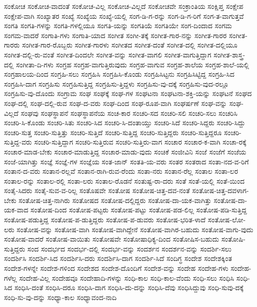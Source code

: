 {ಸಂಕೋಚ
ಸಂಕೋಚ-ವಾದಂತೆ
ಸಂಕೋಚ-ವಿಲ್ಲ
ಸಂಕೋಚ-ವಿಲ್ಲದೆ
ಸಂಕೋಚವೇ
ಸಂಕ್ರಾಂತಿಯ
ಸಂಕ್ಷಿಪ್ತ
ಸಂಕ್ಷೇಪ
ಸಂಕ್ಷೇಪ-ವಾಗಿ
ಸಂಖ್ಯಾತರ
ಸಂಖ್ಯೆ
ಸಂಖ್ಯೆಯ
ಸಂಖ್ಯೆ-ಯಲ್ಲಿ
ಸಂಗ-ಡಿ-ಗ-ರನ್ನು
ಸಂಗ-ಡಿ-ಗ-ರಿಗೆ
ಸಂಗ-ತ-ವಾಗುತ್ತವೆ
ಸಂಗತಿ
ಸಂಗತಿ-ಗಳನ್ನು
ಸಂಗತಿ-ಗಳಲ್ಲಿಯೂ
ಸಂಗತಿ-ಯನ್ನು
ಸಂಗತಿಯೆ
ಸಂಗತಿಯೇ
ಸಂಗ-ದಿಂದಾದ
ಸಂಗಮ
ಸಂಗಮ-ವಾದರೆ
ಸಂಗಾತಿ-ಗಳು
ಸಂಗಾತಿ-ಯಾದ
ಸಂಗೀತ
ಸಂಗೀ-ತಕ್ಕೆ
ಸಂಗೀತ-ಗಾರ-ನನ್ನು
ಸಂಗೀತ-ಗಾರರ
ಸಂಗೀತ-ಗಾರರು
ಸಂಗೀತ-ಗಾರ-ರೊಬ್ಬರು
ಸಂಗೀತ-ಗಾರಳು
ಸಂಗೀತದ
ಸಂಗೀತ-ದಂತೆ
ಸಂಗೀತ-ದಲ್ಲಿ
ಸಂಗೀತ-ದಲ್ಲಿಯೂ
ಸಂಗೀತ-ದಲ್ಲಿ-ರು-ವಂತೆ
ಸಂಗೀತ-ದಿಂದಲೇ
ಸಂಗೀತ-ವನ್ನು
ಸಂಗೀತ-ವಾಗಲಿ
ಸಂಗೀತ-ವಾಗುತ್ತಿದ್ದಾಗ
ಸಂಗೀತ-ಶಾಸ್ತ್ರ-ದಲ್ಲಿ
ಸಂಗೀತಾ-ದಿ-ಗಳು
ಸಂಗ್ರಹ
ಸಂಗ್ರಹ-ವಾಗುತ್ತಿರುವುದು
ಸಂಗ್ರಹ-ವಾಗುವ
ಸಂಗ್ರಹ-ಶಾಲೆಯ
ಸಂಗ್ರಹ-ಶಾಲೆ-ಯಲ್ಲಿ
ಸಂಗ್ರಹಾಲಯ-ದಿಂದ
ಸಂಗ್ರಹಿ-ಸಲು
ಸಂಗ್ರಹಿಸಿ
ಸಂಗ್ರಹಿಸಿ-ಕೊಂಡು
ಸಂಗ್ರಹಿಸಿಟ್ಟನು
ಸಂಗ್ರಹಿಸಿಟ್ಟಿದ್ದ
ಸಂಗ್ರಹಿ-ಸಿದ
ಸಂಗ್ರಹಿಸಿ-ದಾಗ
ಸಂಗ್ರಹಿಸು
ಸಂಗ್ರಹಿಸುತ್ತಿದ್ದ
ಸಂಗ್ರಹಿಸು-ತ್ತಿದ್ದಳು
ಸಂಗ್ರಹಿಸು-ವು-ದಕ್ಕೆ
ಸಂಗ್ರಹಿಸು-ವುದ-ರಲ್ಲೂ
ಸಂಗ್ರಹಿಸು-ವು-ದೊಂದು
ಸಂಗ್ರಾಮ
ಸಂಘ
ಸಂಘಕ್ಕೆ
ಸಂಘ-ಗಳ
ಸಂಘಟನಾ
ಸಂಘಟನಾ-ಶಕ್ತಿ-ಯನ್ನು
ಸಂಘಟನೆ
ಸಂಘದ
ಸಂಘ-ದಲ್ಲಿ
ಸಂಘ-ದಲ್ಲಿ-ರುವ
ಸಂಘ-ದ-ವರು
ಸಂಘ-ದಿಂದ
ಸಂಘ-ರೂಪ-ವಾಗಿ
ಸಂಘರ್ಷಣೆ
ಸಂಘ-ವನ್ನು
ಸಂಘ-ವಿಲ್ಲದೆ
ಸಂಘವು
ಸಂಘಸ್ಥಾಪನೆ
ಸಂಘಸ್ಥಾಪನೆಯ
ಸಂಚ-ಕಾರ
ಸಂಚರಿ-ಸದ
ಸಂಚರಿ-ಸಲಿ
ಸಂಚರಿ-ಸಲು
ಸಂಚರಿಸಿ
ಸಂಚರಿ-ಸಿ-ಕೊಂಡು
ಸಂಚರಿ-ಸಿತು
ಸಂಚರಿ-ಸಿದ
ಸಂಚರಿ-ಸಿ-ದಂತಾಯ್ತು
ಸಂಚರಿ-ಸಿದೆ
ಸಂಚರಿ-ಸಿದ್ದರು
ಸಂಚರಿ-ಸಿದ್ದು
ಸಂಚರಿ-ಸುತ್ತ
ಸಂಚರಿ-ಸುತ್ತಿತ್ತು
ಸಂಚರಿ-ಸುತ್ತಿದೆ
ಸಂಚರಿ-ಸುತ್ತಿದ್ದ
ಸಂಚರಿ-ಸುತ್ತಿದ್ದರು
ಸಂಚರಿ-ಸುತ್ತಿದ್ದರೂ
ಸಂಚರಿ-ಸುತ್ತಿದ್ದ-ವರು
ಸಂಚರಿ-ಸುತ್ತಿದ್ದಾಗ
ಸಂಚರಿ-ಸುತ್ತಿರುವ
ಸಂಚರಿ-ಸುತ್ತಿರು-ವಾಗ
ಸಂಚಾರ
ಸಂಚಾರ-ಕ-ವಾಗಿ
ಸಂಚಾ-ರಕ್ಕೆ
ಸಂಚಾರ-ಮಾಡ-ಬೇಕು
ಸಂಚಾರ-ಮಾಡುತ್ತಿದ್ದ
ಸಂಚಾರ-ಮಾಡು-ವುದು
ಸಂಚಿಕೆ
ಸಂಜೀವಿನಿ
ಸಂಜೆ
ಸಂಜೆಗೆ
ಸಂಜೆಯ
ಸಂಜೆ-ಯಾಗಿತ್ತು
ಸಂಜ್ಞೆ
ಸಂಜ್ಞೆ-ಗಳ
ಸಂಜ್ಞೆಯ
ಸಂತ-ಜಾನ್
ಸಂತತಿ-ಯ-ವರು
ಸಂತರ
ಸಂತರಾದ
ಸಂತಾ-ನದ-ವ-ರಿಗೆ
ಸಂತಾನ-ದ-ವರು
ಸಂತಾನ-ರಲ್ಲವೆ
ಸಂತಾನ-ರಾಗಿ-ರುವ-ರೆಂದು
ಸಂತಾ-ನರು
ಸಂತಾನ-ರೆಲ್ಲ
ಸಂತಾಲ
ಸಂತಾ-ಲರ
ಸಂತಾಲ-ರನ್ನು
ಸಂತಾಲ-ರಲ್ಲಿ
ಸಂತಾ-ಲರು
ಸಂತಾಲ-ರೊಡನೆ
ಸಂತುಷ್ಟ-ರಾ-ದರು
ಸಂತೆ
ಸಂತೆ-ಯಲ್ಲಿ
ಸಂತೆ-ಯಿಂದ
ಸಂತೈ-ಸಿದರು
ಸಂತೈ-ಸುವ-ವ-ರಿಲ್ಲ
ಸಂತೊಷವೇ
ಸಂತೋಷ
ಸಂತೋಷ-ಚಿತ್ತ-ದವ-ನಂತೆ
ಸಂತೋಷ-ಚಿತ್ತ-ದವಳಾಗ-ಬೇಕು
ಸಂತೋಷ-ಚಿತ್ತ-ನಾಗಿರು
ಸಂತೋಷದ
ಸಂತೋಷ-ದಲ್ಲಿದ್ದರು
ಸಂತೋಷ-ದಾ-ಯಕ-ವಾಗಿತ್ತು
ಸಂತೋಷ-ದಾ-ಯಕ-ವಾದ
ಸಂತೋಷ-ದಿಂದ
ಸಂತೋಷ-ಪಟ್ಟರು
ಸಂತೋಷ-ಪಟ್ಟು
ಸಂತೋಷ-ಪಡ-ಲಿಲ್ಲ
ಸಂತೋಷ-ಪಡಿ-ಸುತ್ತಿದ್ದ
ಸಂತೋಷ-ಪಡುತ್ತಿದ್ದ
ಸಂತೋಷ-ಪ-ಡುತ್ತಿದ್ದರು
ಸಂತೋಷ-ಪ-ಡುವರು
ಸಂತೋಷ-ಭರಿತ-ಳಾದೆ
ಸಂತೋಷ-ಲೋ-ಲರು
ಸಂತೋಷ-ವನ್ನು
ಸಂತೋಷ-ವಾಗಿ
ಸಂತೋಷ-ವಾಗಿದ್ದೇನೆ
ಸಂತೋಷ-ವಾಗಿರ-ಬಹುದು
ಸಂತೋಷ-ವಾಗು-ವುದು
ಸಂತೋಷ-ವಾದರೆ
ಸಂತೋಷ-ವಾಯಿತು
ಸಂತೋಷವೇ
ಸಂತೋಷಾಧಿಕ್ಯ-ದಿಂದ
ಸಂತೋಷಿಸ-ಬಹುದು
ಸಂತೋಷಿ-ಸುತ್ತಿದ್ದರು
ಸಂದ
ಸಂದರ್ಭದ
ಸಂದರ್ಭ-ದಲ್ಲಿ
ಸಂದರ್ಭ-ವನ್ನು
ಸಂದರ್ಶನ
ಸಂದರ್ಶನ-ವನ್ನು
ಸಂದರ್ಶಿ-ಸಲು
ಸಂದರ್ಶಿಸಿ
ಸಂದರ್ಶಿ-ಸಿದ
ಸಂದರ್ಶಿಸಿ-ದರು
ಸಂದರ್ಶಿಸಿ-ದಾಗ
ಸಂದರ್ಶಿ-ಸಿದೆ
ಸಂದಿಗ್ಧ
ಸಂದೇಶ
ಸಂದೇಶಕ್ಕಿಂತ
ಸಂದೇಶ-ಗಳನ್ನೇ
ಸಂದೇಶ-ಗಳಿಂದ
ಸಂದೇಶದ
ಸಂದೇಶ-ದೊಂದಿಗೆ
ಸಂದೇಶ-ವನ್ನು
ಸಂದೇಹ
ಸಂದೇಹ-ಗಳು
ಸಂದೇಹ-ಗಳೆಲ್ಲ
ಸಂದೇಹ-ವಿಲ್ಲ
ಸಂದೇಹವೂ
ಸಂದೇಹಾದಿ-ಗಳನ್ನು
ಸಂಧಿ-ಕಾಲ
ಸಂಧಿ-ಕಾಲ-ವೆಂದು
ಸಂಧಿ-ಸಲು
ಸಂಧಿಸಿ
ಸಂಧಿ-ಸಿದ
ಸಂಧಿಸಿ-ದಂತೆ
ಸಂಧಿಸಿ-ದರೂ
ಸಂಧಿಸಿ-ದಾಗ
ಸಂಧಿಸಿ-ದು-ದನ್ನು
ಸಂಧಿಸಿ-ದೆವು
ಸಂಧಿಸಿದ್ದುವು
ಸಂಧಿ-ಸುವು-ದಕ್ಕೆ
ಸಂಧಿ-ಸು-ವು-ದನ್ನು
ಸಂಧ್ಯಾ-ಕಾಲ
ಸಂಧ್ಯಾವಂದ-ನಾದಿ
}
